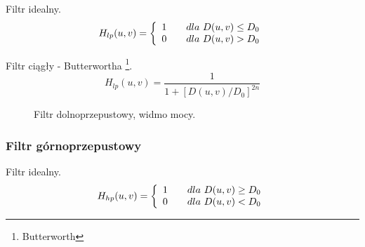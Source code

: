 \documentclass{classrep}
\begin{document}
Filtr idealny.
\begin{equation}
  H_{lp} (u,v) = \left\{
  \begin{array}{l l}
    1 & \quad dla\ D(u,v) \leq D_0 \\
    0 & \quad dla\ D(u,v) > D_0 \\
  \end{array} \right.
\end{equation}

Filtr ciągły - Butterwortha \footnote{Butterworth}.
\begin{equation}
H_{lp}(u,v) = \frac{1}{1+ \left[ D(u,v) / D_0\right] ^{2n} }
\end{equation}

 \begin{figure}[H]
  \centering
  \caption{Filtr dolnoprzepustowy, widmo mocy.}
  \label{fig_widmo_lena_lp}
\end{figure}

\subsubsection{Filtr górnoprzepustowy}

Filtr idealny.
\begin{equation}
  H_{hp}(u,v) = \left\{
  \begin{array}{l l}
    1 & \quad dla\ D(u,v) \geq D_0 \\
    0 & \quad dla\ D(u,v) < D_0 \\
  \end{array} \right.
\end{equation}
\end{document}
